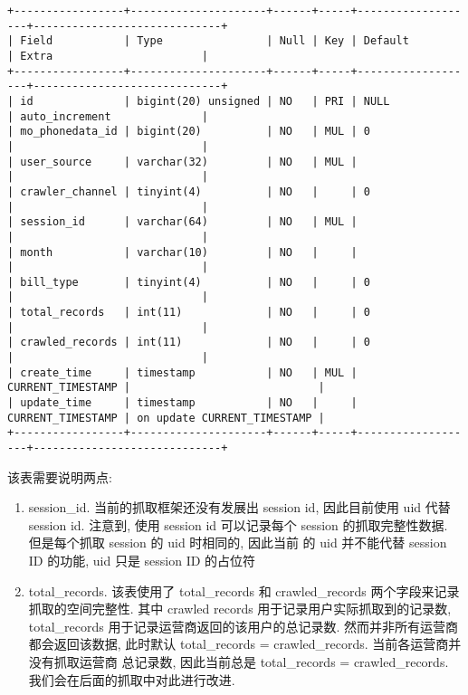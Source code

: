 \documentclass[UTF8]{ctexart}
\begin{document}
\begin{verbatim}
+-----------------+---------------------+------+-----+-------------------+-----------------------------+
| Field           | Type                | Null | Key | Default           | Extra                       |
+-----------------+---------------------+------+-----+-------------------+-----------------------------+
| id              | bigint(20) unsigned | NO   | PRI | NULL              | auto_increment              |
| mo_phonedata_id | bigint(20)          | NO   | MUL | 0                 |                             |
| user_source     | varchar(32)         | NO   | MUL |                   |                             |
| crawler_channel | tinyint(4)          | NO   |     | 0                 |                             |
| session_id      | varchar(64)         | NO   | MUL |                   |                             |
| month           | varchar(10)         | NO   |     |                   |                             |
| bill_type       | tinyint(4)          | NO   |     | 0                 |                             |
| total_records   | int(11)             | NO   |     | 0                 |                             |
| crawled_records | int(11)             | NO   |     | 0                 |                             |
| create_time     | timestamp           | NO   | MUL | CURRENT_TIMESTAMP |                             |
| update_time     | timestamp           | NO   |     | CURRENT_TIMESTAMP | on update CURRENT_TIMESTAMP |
+-----------------+---------------------+------+-----+-------------------+-----------------------------+
\end{verbatim}

该表需要说明两点:
\begin{enumerate}
	\item session_id. 当前的抓取框架还没有发展出 session id, 因此目前使用 uid 代替 session id. 注意到,
使用 session id 可以记录每个 session 的抓取完整性数据. 但是每个抓取 session 的 uid 时相同的, 因此当前
的 uid 并不能代替 session ID 的功能, uid 只是 session ID 的占位符

	\item total_records. 该表使用了 total_records 和 crawled_records 两个字段来记录抓取的空间完整性. 
其中 crawled records 用于记录用户实际抓取到的记录数, total_records 用于记录运营商返回的该用户的总记录数.
然而并非所有运营商都会返回该数据, 此时默认 total_records = crawled_records. 当前各运营商并没有抓取运营商
总记录数, 因此当前总是 total_records = crawled_records. 我们会在后面的抓取中对此进行改进.
\end{enumerate}
\end{document}
